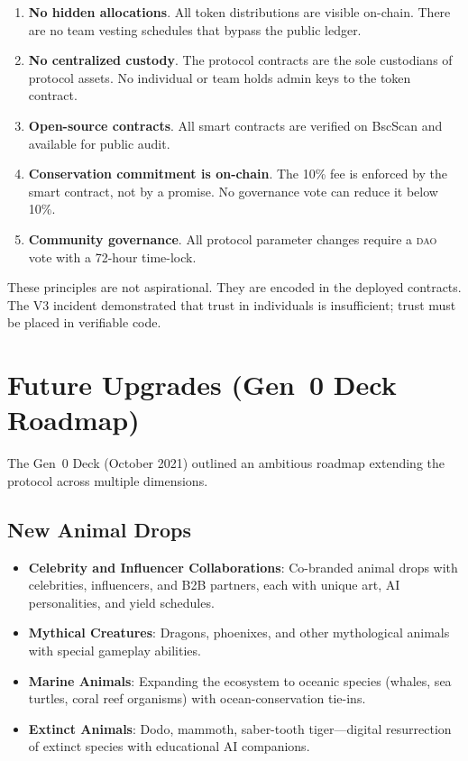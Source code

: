 \documentclass[11pt,letterpaper]{article}
\newcommand{\DAO}{\textsc{dao}}
\begin{document}
\begin{enumerate}
    \item \textbf{No hidden allocations}.  All token distributions are visible on-chain.
          There are no team vesting schedules that bypass the public ledger.
    \item \textbf{No centralized custody}.  The protocol contracts are the sole custodians
          of protocol assets.  No individual or team holds admin keys to the token contract.
    \item \textbf{Open-source contracts}.  All smart contracts are verified on BscScan and
          available for public audit.
    \item \textbf{Conservation commitment is on-chain}.  The 10\% fee is enforced by the
          smart contract, not by a promise.  No governance vote can reduce it below 10\%.
    \item \textbf{Community governance}.  All protocol parameter changes require a \DAO{}
          vote with a 72-hour time-lock.
\end{enumerate}

These principles are not aspirational.  They are encoded in the deployed contracts.  The
V3 incident demonstrated that trust in individuals is insufficient; trust must be placed in
verifiable code.

\section{Future Upgrades (Gen~0 Deck Roadmap)}
\label{sec:future}

The Gen~0 Deck (October 2021) outlined an ambitious roadmap extending the protocol across multiple dimensions.

\subsection{New Animal Drops}

\begin{itemize}
    \item \textbf{Celebrity and Influencer Collaborations}: Co-branded animal drops with celebrities, influencers, and B2B partners, each with unique art, AI personalities, and yield schedules.
    \item \textbf{Mythical Creatures}: Dragons, phoenixes, and other mythological animals with special gameplay abilities.
    \item \textbf{Marine Animals}: Expanding the ecosystem to oceanic species (whales, sea turtles, coral reef organisms) with ocean-conservation tie-ins.
    \item \textbf{Extinct Animals}: Dodo, mammoth, saber-tooth tiger---digital resurrection of extinct species with educational AI companions.
\end{itemize}
\end{document}
